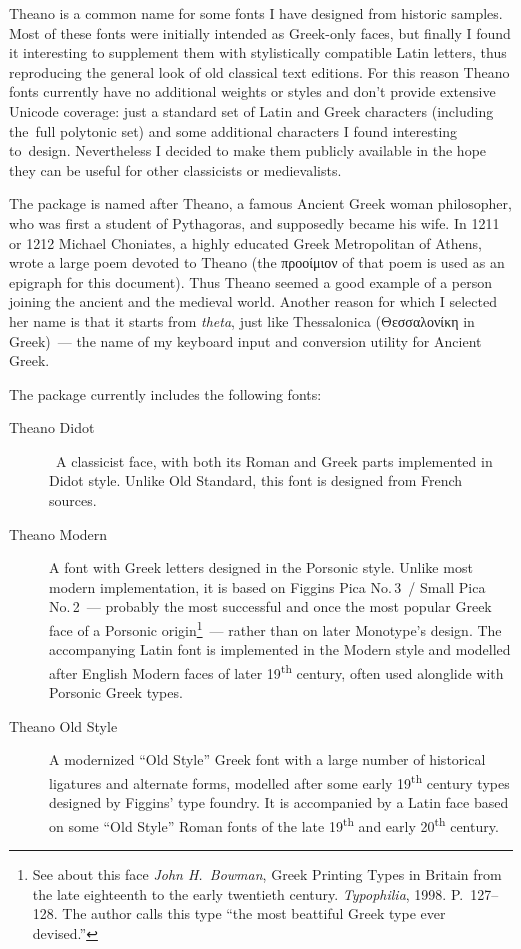 \documentclass[12pt,a4paper,openany]{article}
\begin{document}
Theano is a common name for some fonts I have designed from historic
samples. Most of these fonts were initially intended as Greek-only
faces, but finally I found it interesting to supplement them with
stylistically compatible Latin letters, thus reproducing the general
look of old classical text editions. For this reason Theano fonts currently
have no additional weights or styles and don't provide extensive Unicode
coverage: just a standard set of Latin and Greek characters (including
the~full polytonic set) and some additional characters I found interesting
to~design. Nevertheless I decided to make them publicly available in the
hope they can be useful for other classicists or medievalists.

The package is named after Theano, a famous Ancient Greek woman
philosopher, who was first a student of Pythagoras, and supposedly became
his wife. In 1211 or 1212 Michael Choniates, a highly educated Greek
Metropolitan of Athens, wrote a large poem devoted to Theano (the προοίμιον
of that poem is used as an epigraph for this document). Thus Theano seemed a
good example of a person joining the ancient and the medieval world.
Another reason for which I selected her name is that it starts from
\textit{theta}, just like Thessalonica (Θεσσαλονίκη in Greek)~--- the
name of my keyboard input and conversion utility for Ancient Greek.

The package currently includes the following fonts:

\begin{description}

\item[Theano Didot] A classicist face, with both its Roman and Greek
parts implemented in Didot style. Unlike Old Standard, this font is
designed from French sources.

\item[Theano Modern] A font with Greek letters designed in the Porsonic
style. Unlike most modern implementation, it is based on Figgins Pica
No.\,3~/ Small Pica No.\,2~--- probably the most successful and once the most
popular Greek face of a Porsonic origin\footnote{See about this face
\textit{John H.~Bowman}, Greek Printing Types in Britain from the late
eighteenth to the early twentieth century. \textit{Typophilia}, 1998.
P.~127--128. The author calls this type ``the most beattiful Greek type
ever devised.''}~--- rather than on later Monotype's design. The accompanying
Latin font is implemented in the Modern style and modelled after English
Modern faces of later 19\textsuperscript{th} century, often used alonglide
with Porsonic Greek types.

\item[Theano Old Style] A modernized ``Old Style'' Greek font with a large
number of historical ligatures and alternate forms, modelled after some early
19\textsuperscript{th} century types designed by Figgins' type foundry. It
is accompanied by a Latin face based on some ``Old Style'' Roman fonts of the
late 19\textsuperscript{th} and early 20\textsuperscript{th} century.

\end{description}
\end{document}
